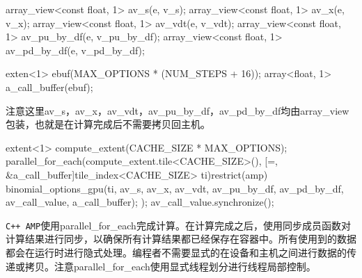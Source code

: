 \begin{codebox}[cpp]
array_view<const float, 1> av_s(e, v_s);
array_view<const float, 1> av_x(e, v_x);
array_view<const float, 1> av_vdt(e, v_vdt);
array_view<const float, 1> av_pu_by_df(e, v_pu_by_df);
array_view<const float, 1> av_pd_by_df(e, v_pd_by_df);

exten<1> ebuf(MAX_OPTIONS * (NUM_STEPS + 16));
array<float, 1> a_call_buffer(ebuf);
\end{codebox}

注意这里av\_\allowbreak{}s，av\_\allowbreak{}x，av\_\allowbreak{}vdt，av\_\allowbreak{}pu\_\allowbreak{}by\_\allowbreak{}df，av\_\allowbreak{}pd\_\allowbreak{}by\_\allowbreak{}df均由array\_\allowbreak{}view包装，也就是在计算完成后不需要拷贝回主机。

\begin{codebox}[cpp]
extent<1> compute_extent(CACHE_SIZE * MAX_OPTIONS);
parallel_for_each(compute_extent.tile<CACHE_SIZE>(),
  [=, &a_call_buffer]tile_index<CACHE_SIZE> ti)restrict(amp){
    binomial_options_gpu(ti, av_s, av_x, av_vdt, av_pu_by_df, av_pd_by_df, av_call_value, a_call_buffer);
  });
av_call_value.synchronize();
\end{codebox}

\texttt{C++ AMP}使用parallel\_\allowbreak{}for\_\allowbreak{}each完成计算。在计算完成之后，使用同步成员函数对计算结果进行同步，以确保所有计算结果都已经保存在容器中。所有使用到的数据都会在运行时进行隐式处理。编程者不需要显式的在设备和主机之间进行数据的传递或拷贝。注意parallel\_\allowbreak{}for\_\allowbreak{}each使用显式线程划分进行线程局部控制。

